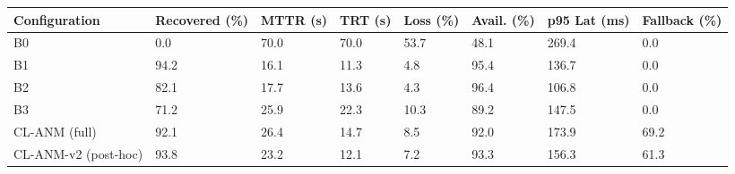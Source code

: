 \begin{tabular}{llllllll}
\toprule
Configuration & Recovered (\%) & MTTR (s) & TRT (s) & Loss (\%) & Avail. (\%) & p95 Lat (ms) & Fallback (\%) \\
\midrule
B0 & 0.0 & 70.0 & 70.0 & 53.7 & 48.1 & 269.4 & 0.0 \\
B1 & 94.2 & 16.1 & 11.3 & 4.8 & 95.4 & 136.7 & 0.0 \\
B2 & 82.1 & 17.7 & 13.6 & 4.3 & 96.4 & 106.8 & 0.0 \\
B3 & 71.2 & 25.9 & 22.3 & 10.3 & 89.2 & 147.5 & 0.0 \\
CL-ANM (full) & 92.1 & 26.4 & 14.7 & 8.5 & 92.0 & 173.9 & 69.2 \\
CL-ANM-v2 (post-hoc) & 93.8 & 23.2 & 12.1 & 7.2 & 93.3 & 156.3 & 61.3 \\
\bottomrule
\end{tabular}
